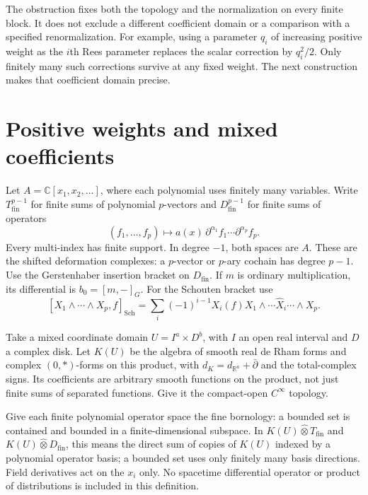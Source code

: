 The obstruction fixes both the topology and the
normalization on every finite block.
It does not exclude a different coefficient domain
or a comparison with a specified renormalization.
For example, using a parameter $q_i$ of increasing
positive weight as the $i$th Rees parameter replaces
the scalar correction by $q_i^2/2$.
Only finitely many such corrections survive at any
fixed weight. The next construction makes that
coefficient domain precise.

\section{Positive weights and mixed coefficients}
\label{sec:vol2-weighted-mixed-formality}

Let $A=\mathbb C[x_1,x_2,\ldots]$, where each polynomial
uses finitely many variables.
Write $T_{\mathrm{fin}}^{p-1}$ for finite sums of
polynomial $p$-vectors and
$D_{\mathrm{fin}}^{p-1}$ for finite sums of operators
\[
 (f_1,\ldots,f_p)\longmapsto
 a(x)\,\partial^{\alpha_1}f_1\cdots\partial^{\alpha_p}f_p.
\]
Every multi-index has finite support.
In degree $-1$, both spaces are $A$.
These are the shifted deformation complexes:
a $p$-vector or $p$-ary cochain has degree $p-1$.
Use the Gerstenhaber insertion bracket on $D_{\mathrm{fin}}$.
If $m$ is ordinary multiplication, its differential is
$b_0=[m,-]_G$.
For the Schouten bracket use
\[
 [X_1\wedge\cdots\wedge X_p,f]_{\mathrm{Sch}}
 =\sum_i(-1)^{i-1}X_i(f)
          X_1\wedge\cdots\widehat X_i\cdots\wedge X_p.
\]

Take a mixed coordinate domain $U=I^a\times D^b$,
with $I$ an open real interval and $D$ a complex disk.
Let $K(U)$ be the algebra of smooth real de Rham
forms and complex $(0,*)$-forms on this product,
with
$d_K=d_{\mathbb R^a}+\bar\partial$
and the total-complex signs.
Its coefficients are arbitrary smooth functions
on the product, not just finite sums of separated
functions. Give it the compact-open $C^\infty$ topology.

Give each finite polynomial operator space the fine
bornology: a bounded set is contained and bounded
in a finite-dimensional subspace.
In $K(U)\widehat\otimes T_{\mathrm{fin}}$ and
$K(U)\widehat\otimes D_{\mathrm{fin}}$, this means
the direct sum of copies of $K(U)$ indexed by a
polynomial operator basis; a bounded set uses only
finitely many basis directions.
Field derivatives act on the $x_i$ only.
No spacetime differential operator or product of
distributions is included in this definition.

